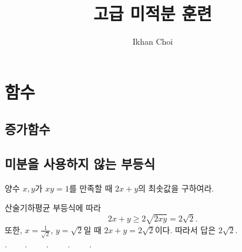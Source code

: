 \documentclass[11pt]{amsbook}
\author{Ikhan Choi}
\title{고급 미적분 훈련}
\makeatletter
\newcommand{\+}{\begin{center}$\cdot\qquad\cdot\qquad\cdot\qquad\cdot\qquad\cdot$\end{center}}
\let\@@section\section
\renewcommand{\section}{\newpage\@@section}
\makeatother
\begin{document}
\maketitle
\tableofcontents


\chapter{함수}

\section{증가함수}

\section{미분을 사용하지 않는 부등식}

\begin{prb}
양수 $x,y$가 $xy=1$를 만족할 때 $2x+y$의 최솟값을 구하여라.
\end{prb}
\begin{sol}
산술기하평균 부등식에 따라
\[2x+y\ge2\sqrt{2xy}=2\sqrt2.\]
또한, $x=\frac1{\sqrt2}$, $y=\sqrt2$일 때 $2x+y=2\sqrt2$이다.
따라서 답은 $2\sqrt2$.
\end{sol}

\+
\end{document}
